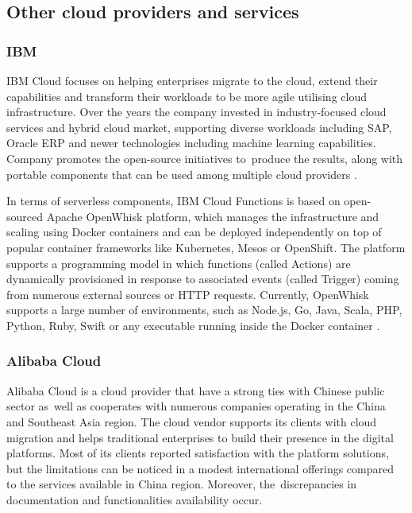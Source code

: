 \subsection{Other cloud providers and services}

\subsubsection{IBM}
IBM Cloud focuses on helping enterprises migrate to the cloud, extend their capabilities and transform their workloads to be more agile utilising cloud infrastructure. Over the years the company invested in industry-focused cloud services and hybrid cloud market, supporting diverse workloads including SAP, Oracle ERP and newer technologies including machine learning capabilities. Company promotes the open-source initiatives to~produce the results, along with portable components that can be used among multiple cloud providers \cite{Gartner}.

In terms of serverless components, IBM Cloud Functions is based on open-sourced Apache OpenWhisk platform, which manages the infrastructure and scaling using Docker containers and can be deployed independently on top of popular container frameworks like Kubernetes, Mesos or OpenShift. The platform supports a programming model in which functions (called Actions) are dynamically provisioned in response to associated events (called Trigger) coming from numerous external sources or HTTP requests. Currently, OpenWhisk supports a large number of environments, such as Node.js, Go, Java, Scala, PHP, Python, Ruby, Swift or any executable running inside the Docker container \cite{ApacheOpenWhisk}.

\subsubsection{Alibaba Cloud}

Alibaba Cloud is a cloud provider that have a strong ties with Chinese public sector as~well as cooperates with numerous companies operating in the China and Southeast Asia region. The cloud vendor supports its clients with cloud migration and helps traditional enterprises to build their presence in the digital platforms. Most of its clients reported satisfaction with the platform solutions, but the limitations can be noticed in a modest international offerings compared to the services available in China region. Moreover, the~discrepancies in documentation and functionalities availability \cite{Gartner} occur.

